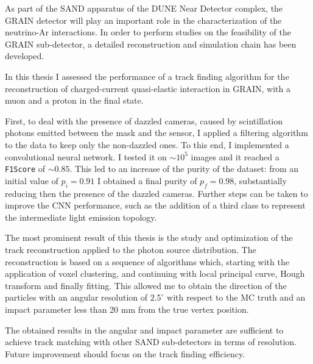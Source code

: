 As part of the SAND apparatus of the DUNE Near Detector complex, the GRAIN detector will play an important role in the characterization of the neutrino-Ar interactions. In order to perform studies on the feasibility of the GRAIN sub-detector, a detailed reconstruction and simulation chain has been developed.

In this thesis I assessed the performance of a track finding algorithm for the reconstruction of charged-current quasi-elastic interaction in GRAIN, with a muon and a proton in the final state.

First, to deal with the presence of dazzled cameras, caused by scintillation photons emitted between the mask and the sensor, I applied a filtering algorithm to the data to keep only the non-dazzled ones. To this end, I implemented a convolutional neural network. I tested it on $\sim 10^5$ images and it reached a \texttt{F1Score} of $\sim 0.85$. This led to an increase of the purity of the dataset: from an initial value of $p_i = 0.91$ I obtained a final purity of $p_f = 0.98$, substantially reducing then the presence of the dazzled cameras. Further steps can be taken to improve the CNN performance, such as the addition of a third class to represent the intermediate light emission topology.

The most prominent result of this thesis is the study and optimization of the track reconstruction applied to the photon source distribution. The reconstruction is based on a sequence of algorithms which, starting with the application of voxel clustering, and continuing with local principal curve, Hough transform and finally fitting. This allowed me to obtain the direction of the particles with an angular resolution of $2.5 ^\circ$ with respect to the MC truth and an impact parameter less than 20 mm from the true vertex position. 

The obtained results in the angular and impact parameter are sufficient to achieve track matching with other SAND sub-detectors in terms of resolution. Future improvement should focus on the track finding efficiency.

